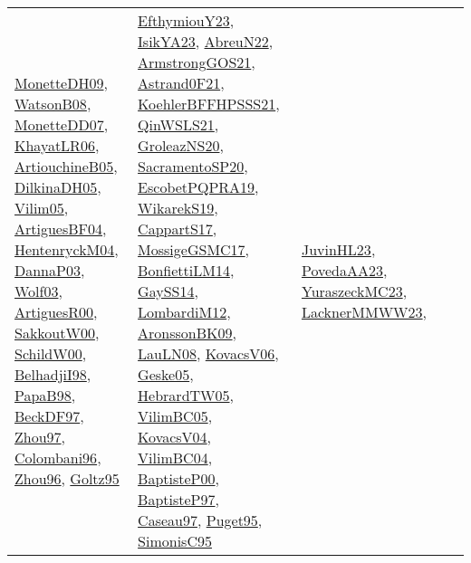 {\begin{longtable}{lp{3cm}>{\raggedright}p{6cm}>{\raggedright}p{6cm}p{8cm}}
\href{papers/MonetteDH09.pdf}{MonetteDH09}\cite{MonetteDH09}, \href{papers/WatsonB08.pdf}{WatsonB08}\cite{WatsonB08}, \href{papers/MonetteDD07.pdf}{MonetteDD07}\cite{MonetteDD07}, \href{articles/KhayatLR06.pdf}{KhayatLR06}\cite{KhayatLR06}, \href{papers/ArtiouchineB05.pdf}{ArtiouchineB05}\cite{ArtiouchineB05}, \href{papers/DilkinaDH05.pdf}{DilkinaDH05}\cite{DilkinaDH05}, \href{papers/Vilim05.pdf}{Vilim05}\cite{Vilim05}, \href{papers/ArtiguesBF04.pdf}{ArtiguesBF04}\cite{ArtiguesBF04}, \href{papers/HentenryckM04.pdf}{HentenryckM04}\cite{HentenryckM04}, \href{papers/DannaP03.pdf}{DannaP03}\cite{DannaP03}, \href{papers/Wolf03.pdf}{Wolf03}\cite{Wolf03}, \href{articles/ArtiguesR00.pdf}{ArtiguesR00}\cite{ArtiguesR00}, \href{articles/SakkoutW00.pdf}{SakkoutW00}\cite{SakkoutW00}, \href{articles/SchildW00.pdf}{SchildW00}\cite{SchildW00}, \href{articles/BelhadjiI98.pdf}{BelhadjiI98}\cite{BelhadjiI98}, \href{articles/PapaB98.pdf}{PapaB98}\cite{PapaB98}, \href{papers/BeckDF97.pdf}{BeckDF97}\cite{BeckDF97}, \href{articles/Zhou97.pdf}{Zhou97}\cite{Zhou97}, \href{papers/Colombani96.pdf}{Colombani96}\cite{Colombani96}, \href{papers/Zhou96.pdf}{Zhou96}\cite{Zhou96}, \href{papers/Goltz95.pdf}{Goltz95}\cite{Goltz95} & \href{papers/EfthymiouY23.pdf}{EfthymiouY23}\cite{EfthymiouY23}, \href{articles/IsikYA23.pdf}{IsikYA23}\cite{IsikYA23}, \href{articles/AbreuN22.pdf}{AbreuN22}\cite{AbreuN22}, \href{papers/ArmstrongGOS21.pdf}{ArmstrongGOS21}\cite{ArmstrongGOS21}, \href{papers/Astrand0F21.pdf}{Astrand0F21}\cite{Astrand0F21}, \href{articles/KoehlerBFFHPSSS21.pdf}{KoehlerBFFHPSSS21}\cite{KoehlerBFFHPSSS21}, \href{articles/QinWSLS21.pdf}{QinWSLS21}\cite{QinWSLS21}, \href{papers/GroleazNS20.pdf}{GroleazNS20}\cite{GroleazNS20}, \href{articles/SacramentoSP20.pdf}{SacramentoSP20}\cite{SacramentoSP20}, \href{articles/EscobetPQPRA19.pdf}{EscobetPQPRA19}\cite{EscobetPQPRA19}, \href{articles/WikarekS19.pdf}{WikarekS19}\cite{WikarekS19}, \href{papers/CappartS17.pdf}{CappartS17}\cite{CappartS17}, \href{papers/MossigeGSMC17.pdf}{MossigeGSMC17}\cite{MossigeGSMC17}, \href{papers/BonfiettiLM14.pdf}{BonfiettiLM14}\cite{BonfiettiLM14}, \href{papers/GaySS14.pdf}{GaySS14}\cite{GaySS14}, \href{articles/LombardiM12.pdf}{LombardiM12}\cite{LombardiM12}, \href{papers/AronssonBK09.pdf}{AronssonBK09}\cite{AronssonBK09}, \href{papers/LauLN08.pdf}{LauLN08}\cite{LauLN08}, \href{papers/KovacsV06.pdf}{KovacsV06}\cite{KovacsV06}, \href{papers/Geske05.pdf}{Geske05}\cite{Geske05}, \href{papers/HebrardTW05.pdf}{HebrardTW05}\cite{HebrardTW05}, \href{articles/VilimBC05.pdf}{VilimBC05}\cite{VilimBC05}, \href{papers/KovacsV04.pdf}{KovacsV04}\cite{KovacsV04}, \href{papers/VilimBC04.pdf}{VilimBC04}\cite{VilimBC04}, \href{articles/BaptisteP00.pdf}{BaptisteP00}\cite{BaptisteP00}, \href{papers/BaptisteP97.pdf}{BaptisteP97}\cite{BaptisteP97}, \href{papers/Caseau97.pdf}{Caseau97}\cite{Caseau97}, \href{papers/Puget95.pdf}{Puget95}\cite{Puget95}, \href{papers/SimonisC95.pdf}{SimonisC95}\cite{SimonisC95} & \href{papers/JuvinHL23.pdf}{JuvinHL23}\cite{JuvinHL23}, \href{papers/PovedaAA23.pdf}{PovedaAA23}\cite{PovedaAA23}, \href{papers/YuraszeckMC23.pdf}{YuraszeckMC23}\cite{YuraszeckMC23}, \href{articles/LacknerMMWW23.pdf}{LacknerMMWW23}\cite{LacknerMMWW23}, 
\end{longtable}}
